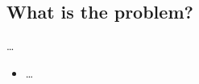 \subsection{What is the problem?}

\dots

\begin{frame}
  \begin{itemize}
    \item \dots
  \end{itemize}
\end{frame}



\begin{frame}[allowframebreaks]
  \printbibliography{}
\end{frame}
